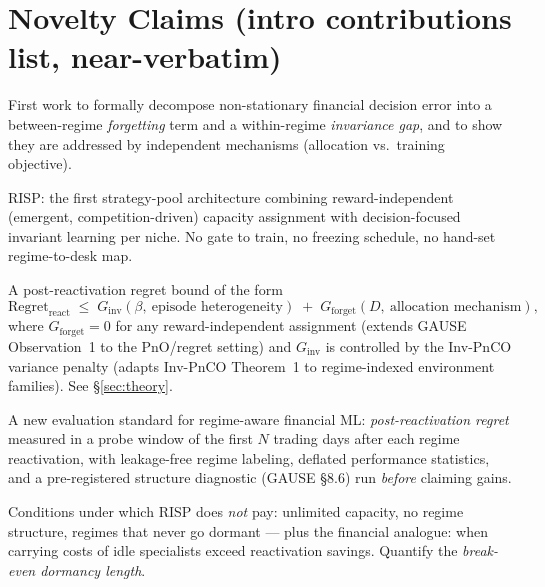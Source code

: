 \documentclass[11pt]{article}
\newcommand{\risp}{\textsc{RISP}}
\begin{document}
\section{Novelty Claims (intro contributions list, near-verbatim)}
\begin{description}[leftmargin=1.6em]
  \item[C1 --- Problem decomposition.] First work to formally decompose non-stationary financial decision error into a between-regime \emph{forgetting} term and a within-regime \emph{invariance gap}, and to show they are addressed by independent mechanisms (allocation vs.\ training objective).
  \item[C2 --- Method.] \risp: the first strategy-pool architecture combining reward-independent (emergent, competition-driven) capacity assignment with decision-focused invariant learning per niche. No gate to train, no freezing schedule, no hand-set regime-to-desk map.
  \item[C3 --- Theory.] A post-reactivation regret bound of the form
  \[
    \mathrm{Regret}_{\text{react}} \;\le\; G_{\mathrm{inv}}(\beta,\ \text{episode heterogeneity}) \;+\; G_{\mathrm{forget}}(D,\ \text{allocation mechanism}),
  \]
  where $G_{\mathrm{forget}}=0$ for any reward-independent assignment (extends GAUSE Observation~1 to the PnO/regret setting) and $G_{\mathrm{inv}}$ is controlled by the Inv-PnCO variance penalty (adapts Inv-PnCO Theorem~1 to regime-indexed environment families). See \S\ref{sec:theory}.
  \item[C4 --- Evaluation protocol.] A new evaluation standard for regime-aware financial ML: \emph{post-reactivation regret} measured in a probe window of the first $N$ trading days after each regime reactivation, with leakage-free regime labeling, deflated performance statistics, and a pre-registered structure diagnostic (GAUSE \S8.6) run \emph{before} claiming gains.
  \item[C5 --- Honest audit.] Conditions under which \risp{} does \emph{not} pay: unlimited capacity, no regime structure, regimes that never go dormant --- plus the financial analogue: when carrying costs of idle specialists exceed reactivation savings. Quantify the \emph{break-even dormancy length}.
\end{description}
\end{document}
